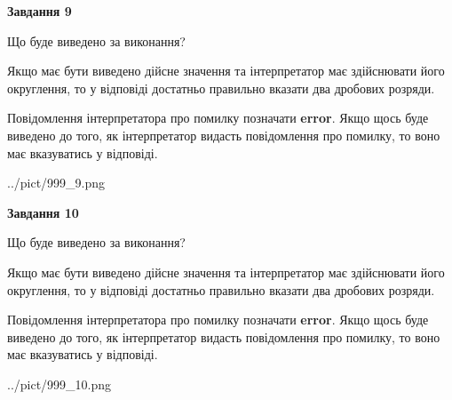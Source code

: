 \documentclass[12pt, ukrainian]{article}
\begin{document}
{\begin {Large}
{\begin {center}\textbf{Завдання 9}\end {center}}\par
Що буде виведено за виконання? \par

Якщо має бути виведено дійсне значення та інтерпретатор має здійснювати його округлення, 
то у відповіді достатньо правильно вказати два дробових розряди.

Повідомлення інтерпретатора про помилку позначати \textbf{error}.
Якщо щось буде виведено до того, як інтерпретатор видасть повідомлення про помилку, 
то воно має вказуватись у відповіді. \par

\begin{center}
	{../pict/999_9.png}
\end{center}
\newpage

{\begin {center}\textbf{Завдання 10}\end {center}}\par
Що буде виведено за виконання? \par

Якщо має бути виведено дійсне значення та інтерпретатор має здійснювати його округлення, 
то у відповіді достатньо правильно вказати два дробових розряди.

Повідомлення інтерпретатора про помилку позначати \textbf{error}.
Якщо щось буде виведено до того, як інтерпретатор видасть повідомлення про помилку, 
то воно має вказуватись у відповіді. \par

\begin{center}
	{../pict/999_10.png}
\end{center}
\newpage

\end {Large}}
\end{document}
